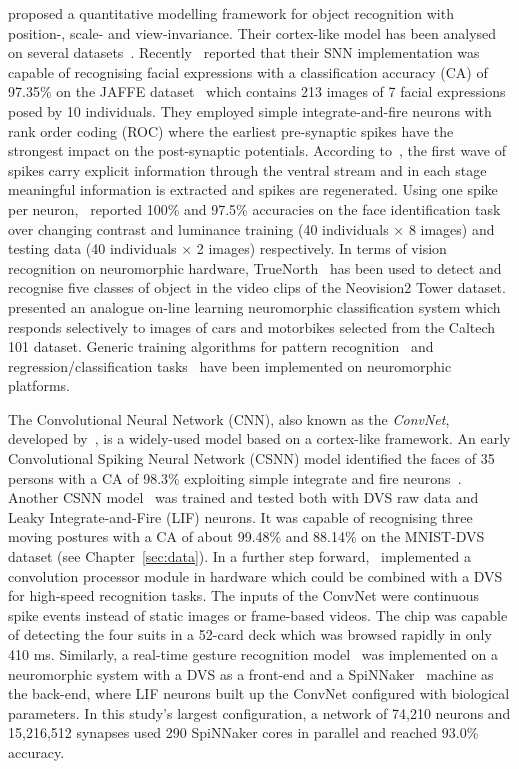 \cite{riesenhuber1999hierarchical} proposed a quantitative modelling framework for object recognition with position-, scale- and view-invariance.
Their cortex-like model has been analysed on several datasets~\cite{serre2007robust}.
Recently~\cite{fu2012spiking} reported that their SNN implementation was capable of recognising facial expressions with a classification accuracy (CA) of 97.35\% on the JAFFE dataset~\cite{lyons1998coding} which contains 213 images of 7 facial expressions posed by 10 individuals.
They employed simple integrate-and-fire neurons with rank order coding (ROC) where the earliest pre-synaptic spikes have the strongest impact on the post-synaptic potentials.
According to~\cite{vanrullen2002surfing}, the first wave of spikes carry explicit information through the ventral stream and in each stage meaningful information is extracted and spikes are regenerated. 
Using one spike per neuron,~\cite{delorme2001face} reported 100\% and 97.5\% accuracies on the face identification task over changing  contrast and luminance training (40 individuals $\times$ 8 images) and testing data (40 individuals $\times$ 2 images) respectively.
In terms of vision recognition on neuromorphic hardware, TrueNorth~\cite{merolla2014million} has been used to detect and recognise five classes of object in the video clips of the Neovision2 Tower dataset.
\cite{Qiao2015re} presented an analogue on-line learning neuromorphic classification system which responds selectively to images of cars and motorbikes selected from the Caltech 101 dataset.
Generic training algorithms for pattern recognition~\cite{schmuker2014neuromorphic} and regression/classification tasks~\cite{thakur2016low} have been implemented on neuromorphic platforms.

The Convolutional Neural Network (CNN), also known as the \textit{ConvNet}, developed by~\cite{lecun1998gradient}, is a widely-used model based on a cortex-like framework.
An early Convolutional Spiking Neural Network (CSNN) model identified the faces of 35 persons with a CA of 98.3\% exploiting simple integrate and fire neurons~\cite{matsugu2002convolutional}.
Another CSNN model~\cite{zhao2014feedforward} was trained and tested both with DVS raw data and Leaky Integrate-and-Fire (LIF) neurons.
It was capable of recognising three moving postures with a CA of about 99.48\% and 88.14\% on the MNIST-DVS dataset (see Chapter~\ref{sec:data}).
In a further step forward,~\cite{camunas2012event} implemented a convolution processor module in hardware which could be combined with a DVS for high-speed recognition tasks.
The inputs of the ConvNet were continuous spike events instead of static images or frame-based videos. 
The chip was capable of detecting the four suits in a 52-card deck which was browsed rapidly in only 410 ms.
Similarly, a real-time gesture recognition model~\cite{liu2014real} was implemented on a neuromorphic system with a DVS as a front-end and a SpiNNaker~\cite{furber2014spinnaker} machine as the back-end, where LIF neurons built up the ConvNet configured with biological parameters.
In this study's largest configuration, a network of 74,210 neurons and 15,216,512 synapses used 290 SpiNNaker cores in parallel and reached 93.0\% accuracy. 

